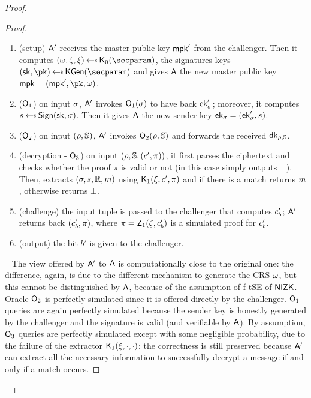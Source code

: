 \begin{proof}
\begin{lemma}
\begin{proof}
            \begin{enumerate}
                \item (setup) $\mathsf{A}'$ receives the master public key $\mathsf{mpk}'$ from the challenger. Then it computes $(\crs,\tpsim,\tpext)\getsr\nizkext_0(\secparam)$, the signatures keys $(\sk, \pk) \getsr \kgen(\secparam)$ and gives $\mathsf{A}$ the new master public key $\mpk = (\mpk', \pk, \crs)$.
                \item ($\mathsf{O}_1$) on input $\sigma$, $\mathsf{A}'$ invokes $\mathsf{O}_1(\sigma)$ to have back $\mathsf{ek}'_\sigma$; moreover, it computes $\signature \getsr \sign(\sk, \sattr)$. Then it gives $\mathsf{A}$ the new sender key $\mathsf{ek}_\sigma = (\mathsf{ek}'_\sigma, s)$.
                \item ($\mathsf{O}_2$) on input $(\rho, \mathbb{S})$, $\mathsf{A}'$ invokes $\mathsf{O}_2(\rho, \mathbb{S})$ and forwards the received $\mathsf{dk}_{\rho, \mathbb{S}}$.
                \item (decryption - $\mathsf{O}_3$) on input $(\rho, \mathbb{S}, (c', \pi))$, it first parses the ciphertext and checks whether the proof $\pi$ is valid or not (in this case simply outputs $\bot$). Then, extracts $(\sigma, s, \mathbb{R}, m)$ using $\mathsf{K}_1(\xi,c',\pi)$ and if there is a match returns $m$, otherwise returns $\bot$.
                \item (challenge) the input tuple is passed to the challenger that computes $c'_b$; $\mathsf{A}'$ returns back $(c'_b, \pi)$, where $\pi = \mathsf{Z}_1(\zeta, c'_b)$ is a simulated proof for $c'_b$.
                \item (output) the bit $b'$ is given to the challenger.
            \end{enumerate}
            ~\newline
            The view offered by $\mathsf{A}'$ to $\mathsf{A}$ is computationally close to the original one: the difference, again, is due to the different mechanism to generate the CRS $\omega$, but this cannot be distinguished by $\mathsf{A}$, because of the assumption of f-tSE of $\mathsf{NIZK}$.
            Oracle $\mathsf{O}_2$ is perfectly simulated since it is offered directly by the challenger.
            $\mathsf{O}_1$ queries are again perfectly simulated because the sender key is honestly generated by the challenger and the signature is valid (and verifiable by $\mathsf{A}$).
            By assumption, $\mathsf{O}_3$ queries are perfectly simulated except with some negligible probability, due to the failure of the extractor $\mathsf{K}_1(\xi, \cdot, \cdot)$: the correctness is still preserved because $\mathsf{A}'$ can extract all the necessary information to successfully decrypt a message if and only if a match occurs.
        \end{proof}
    \end{lemma}


\end{proof}
